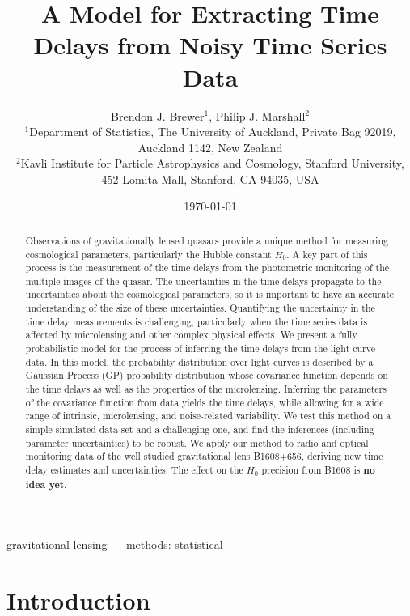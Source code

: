 \documentclass[useAMS,usenatbib, a4paper]{mn2e} \usepackage{natbib}
\title[Measuring Time Delays]
{A Model for Extracting Time Delays from Noisy Time Series Data}
\author[B. J. Brewer]{Brendon J. Brewer$^1$, Philip J. Marshall$^2$\\
$^1$Department of Statistics, The University of Auckland, Private Bag 92019,
Auckland 1142, New Zealand\\
$^2$Kavli Institute for Particle Astrophysics and Cosmology, Stanford University, 452 Lomita Mall, Stanford, CA 94035, USA}
\begin{document}
 

\date{\today} 
\pagerange{\pageref{firstpage}--\pageref{lastpage}}  
\maketitle \label{firstpage}


\begin{abstract}
Observations of gravitationally lensed quasars provide a unique method for
measuring cosmological parameters, particularly the Hubble constant $H_0$.
A key part of
this process is the measurement of the time delays from the photometric
monitoring of the multiple images of the quasar. The uncertainties in the time
delays propagate to the uncertainties about the cosmological parameters, so it
is important to have an accurate understanding of the size of these uncertainties.
Quantifying the
uncertainty in the time delay measurements is challenging, particularly when the time series
data is affected by microlensing and other complex physical effects. We present a
fully probabilistic model for the process of inferring the time delays from
the light curve data. In this model, the probability distribution over light
curves is described by a Gaussian Process (GP) probability distribution whose covariance function
depends on the time delays as well as the properties of the microlensing.
Inferring the parameters of the covariance function from data yields
the time delays, while allowing for a wide range of intrinsic, microlensing, and 
noise-related variability. We test this method on a simple simulated data set
and a challenging one, 
and find the inferences (including parameter uncertainties) to be robust.
We apply our method to radio and optical monitoring data of the well
studied gravitational lens B1608+656, deriving new time delay estimates and uncertainties. The effect on the $H_0$ precision from B1608 is {\bf no idea yet}.
\end{abstract}

\begin{keywords} gravitational lensing --- methods: statistical --- 
\end{keywords}


\section{Introduction} 
\end{document}
